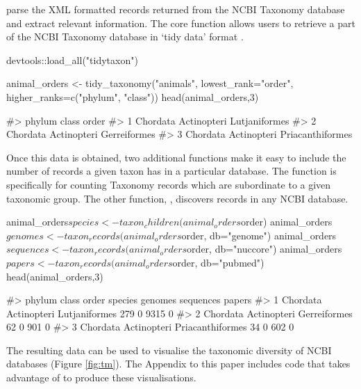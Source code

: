 parse the XML formatted records returned from the NCBI Taxonomy database and
extract relevant information. The core function  allows 
users to retrieve a part of the NCBI  Taxonomy database in `tidy data' format
\citep{tidy-data}.

\begin{example}
devtools::load_all("tidytaxon")

animal_orders <- tidy_taxonomy("animals", 
                               lowest_rank="order",
                               higher_ranks=c("phylum", "class"))
head(animal_orders,3)

#>     phylum       class            order
#> 1 Chordata Actinopteri    Lutjaniformes
#> 2 Chordata Actinopteri     Gerreiformes
#> 3 Chordata Actinopteri Priacanthiformes
\end{example}

Once this data is obtained, two additional functions make it easy to include the
number of records a given taxon has in a particular database. The function
 is specifically for counting Taxonomy records which are
subordinate to a given taxonomic group. The other function,  , 
discovers records in any NCBI database.

\begin{example}
animal_orders$species <- taxon_children(animal_orders$order)
animal_orders$genomes <- taxon_records(animal_orders$order, db="genome")
animal_orders$sequences <- taxon_records(animal_orders$order, db="nuccore")
animal_orders$papers <- taxon_records(animal_orders$order, db="pubmed")
head(animal_orders,3)

#>     phylum       class            order species genomes sequences papers
#> 1 Chordata Actinopteri    Lutjaniformes     279       0      9315      0
#> 2 Chordata Actinopteri     Gerreiformes      62       0       901      0
#> 3 Chordata Actinopteri Priacanthiformes      34       0       602      0
\end{example}

The resulting data can be used to visualise the taxonomic diversity of NCBI 
databases (Figure \ref{fig:tm}). The Appendix to this paper 
includes code that takes advantage of  \citep{treemap} to 
produce these visualisations. 

